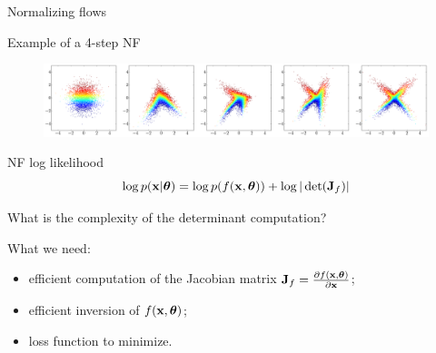\begin{frame}{Normalizing flows}
	\begin{block}{Example of a 4-step NF}
		\vspace{-0.2cm}
		\begin{figure}
			\includegraphics[width=\linewidth]{figs/flow_4_steps_example.png}
		\end{figure}
	\end{block}
	\vspace{-0.5cm}
	\begin{block}{NF log likelihood}
		\vspace{-0.3cm}
		\[
		\log p(\mathbf{x}|\boldsymbol{\theta}) = \log p(f(\mathbf{x}, \boldsymbol{\theta})) + \log |\det ( \mathbf{J}_f)|
		\]
		\vspace{-0.3cm}
	\end{block}
	What is the complexity of the determinant computation?
	\begin{block}{What we need:}
		\begin{itemize}
			\item efficient computation of the Jacobian matrix $\mathbf{J}_f = \frac{\partial f(\mathbf{x}, \boldsymbol{\theta})}{\partial \mathbf{x}}$;
			\item efficient inversion of $f(\mathbf{x}, \boldsymbol{\theta})$;
			\item loss function to minimize.
		\end{itemize}
	\end{block}
\end{frame}

